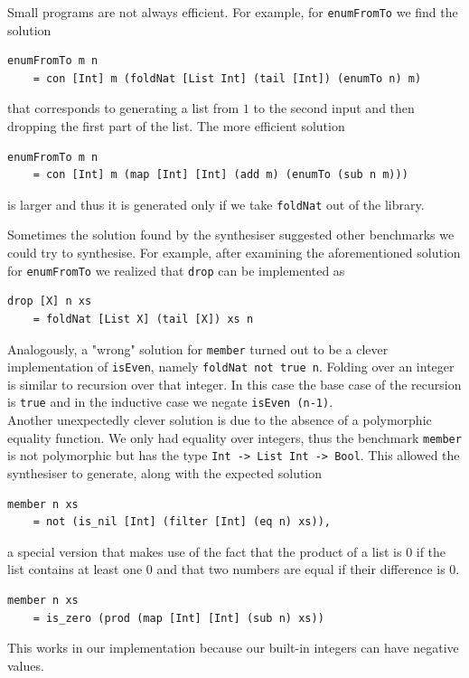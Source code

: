 Small programs are not always efficient. For example, for \lstinline?enumFromTo? we find the solution
\begin{lstlisting}
enumFromTo m n
    = con [Int] m (foldNat [List Int] (tail [Int]) (enumTo n) m)
\end{lstlisting}
that corresponds to generating a list from $1$ to the second input and then dropping the first part of the list. The more efficient solution
\begin{lstlisting}
enumFromTo m n
    = con [Int] m (map [Int] [Int] (add m) (enumTo (sub n m)))
\end{lstlisting}
is larger and thus it is generated only if we take \lstinline?foldNat? out of the library.

Sometimes the solution found by the synthesiser suggested other benchmarks we could try to synthesise. For example, after examining the aforementioned solution for \lstinline?enumFromTo? we realized that \lstinline?drop? can be implemented as
\begin{lstlisting}
drop [X] n xs
    = foldNat [List X] (tail [X]) xs n
\end{lstlisting}
Analogously, a "wrong" solution for \lstinline?member? turned out to be a clever implementation of \lstinline?isEven?, namely \lstinline?foldNat not true n?. Folding over an integer is similar to recursion over that integer. In this case the base case of the recursion is \lstinline?true? and in the inductive case we negate \lstinline?isEven (n-1)?.\\
Another unexpectedly clever solution is due to the absence of a polymorphic equality function. We only had equality over integers, thus the benchmark \lstinline?member? is not polymorphic but has the type \lstinline?Int -> List Int -> Bool?. This allowed the synthesiser to generate, along with the expected solution
\begin{lstlisting}
member n xs
    = not (is_nil [Int] (filter [Int] (eq n) xs)),
\end{lstlisting}
a special version that makes use of the fact that the product of a list is $0$ if the list contains at least one $0$ and that two numbers are equal if their difference is $0$.
\begin{lstlisting}
member n xs
    = is_zero (prod (map [Int] [Int] (sub n) xs))

\end{lstlisting}
This works in our implementation because our built-in integers can have negative values.

